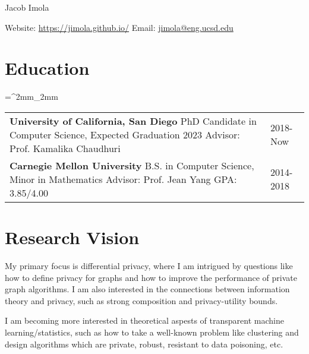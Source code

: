 \documentclass[11pt]{article}
\begin{document}


\centerline{{\Huge Jacob Imola}}
\noindent Website: \href{https://jimola.github.io/}{https://jimola.github.io/} \hfill Email: \href{mailto:jimola@eng.ucsd.edu}{jimola@eng.ucsd.edu}

\section*{Education}
\tabulinesep=^2mm_2mm
\begin{tabu}{X[4, l] X[1, l]}
	\setlength{\extrarowsep}{3mm}
  \textbf{University of California, San Diego} \newline
  PhD Candidate in Computer Science, Expected Graduation 2023 \newline
  Advisor: Prof. Kamalika Chaudhuri 
	&
  2018-Now \\
  \textbf{Carnegie Mellon University} \newline
  B.S. in Computer Science, Minor in Mathematics \newline
  Advisor: Prof. Jean Yang \newline
  GPA: 3.85/4.00
	&
  2014-2018 \\
\end{tabu}

\section*{Research Vision}
My primary focus is differential privacy, where I 
am intrigued by questions like how to define privacy for graphs and how to improve the performance of private graph algorithms.
I am also interested in the connections between information theory and privacy, such as strong composition and privacy-utility bounds.

I am becoming more interested in theoretical aspests of transparent machine learning/statistics, such as how to take a well-known 
problem like clustering and design algorithms which are private, robust, resistant to data poisoning, etc.
\end{document}
